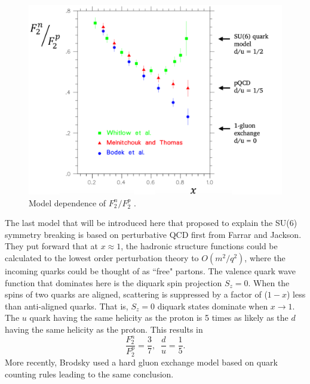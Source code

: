 \begin{figure}[h!]
	\centering
	\includegraphics[width=0.9\linewidth]{figures/f2n_f2p_models.png}
	\caption[Model dependence of $F_2^n/F_2^p$.]{Model dependence of $F_2^n/F_2^p$ \cite{marathon}.}
	\label{fig:f2n_f2p_models}
\end{figure}

The last model that will be introduced here that proposed to explain the SU(6) symmetry breaking is based on perturbative QCD first from Farrar and Jackson.\cite{physlett:farrar} They put forward that at $x \approx 1$, the hadronic structure functions could be calculated to the lowest order perturbation theory to $O(m^2/q^2)$, where the incoming quarks could be thought of as ``free" partons. The valence quark wave function that dominates here is the diquark spin projection $S_z = 0$. When the spins of two quarks are aligned, scattering is suppressed by a factor of ($1-x$) less than anti-aligned quarks. That is, $S_z = 0$ diquark states dominate when $x \rightarrow 1$. The $u$ quark having the same helicity as the proton is 5 times as likely as the $d$ having the same helicity as the proton. This results in
\begin{equation}
\frac{F_2^n}{F_2^p}  = \frac{3}{7}, \; \; \frac{d}{u} =\frac{1}{5}.
\end{equation}
More recently, Brodsky \cite{brodsky} used a hard gluon exchange model based on quark counting rules leading to the same conclusion.
 
